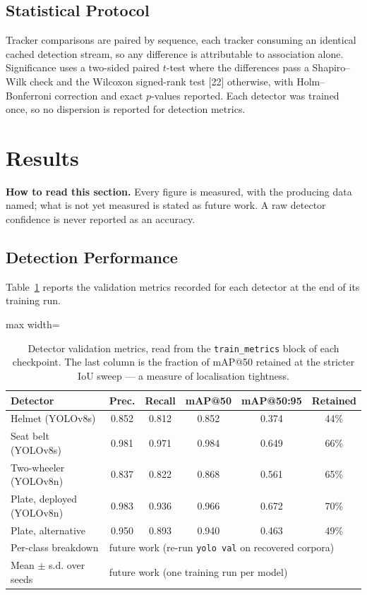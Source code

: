 \documentclass[10pt,a4paper,twocolumn]{article}
\newcommand{\code}[1]{\texttt{#1}}
\begin{document}
\subsection{Statistical Protocol}
Tracker comparisons are paired by sequence, each tracker consuming an identical cached detection stream, so any
difference is attributable to association alone. Significance uses a two-sided paired $t$-test where the differences
pass a Shapiro--Wilk check and the Wilcoxon signed-rank test [22] otherwise, with Holm--Bonferroni correction and exact
$p$-values reported. Each detector was trained once, so no dispersion is reported for detection metrics.

\section{Results}
\textbf{How to read this section.} Every figure is measured, with the producing data named; what is not yet measured
is stated as future work. A raw detector confidence is never reported as an accuracy.

\subsection{Detection Performance}
Table~\ref{tab:det} reports the validation metrics recorded for each detector at the end of its training run.

\begin{table}[t]
\centering\scriptsize
\caption{Detector validation metrics, read from the \code{train\_metrics} block of each checkpoint. The last column
is the fraction of mAP@50 retained at the stricter IoU sweep --- a measure of localisation tightness.}\label{tab:det}
\setlength{\tabcolsep}{2.4pt}
\begin{adjustbox}{max width=\columnwidth}
\begin{tabular}{@{}lccccc@{}}
\toprule
Detector & Prec. & Recall & mAP@50 & mAP@50:95 & Retained\\
\midrule
Helmet (YOLOv8s) & 0.852 & 0.812 & 0.852 & 0.374 & 44\%\\
Seat belt (YOLOv8s) & 0.981 & 0.971 & 0.984 & 0.649 & 66\%\\
Two-wheeler (YOLOv8n) & 0.837 & 0.822 & 0.868 & 0.561 & 65\%\\
Plate, deployed (YOLOv8n) & 0.983 & 0.936 & 0.966 & 0.672 & 70\%\\
Plate, alternative & 0.950 & 0.893 & 0.940 & 0.463 & 49\%\\
\midrule
Per-class breakdown & \multicolumn{5}{l}{future work (re-run \code{yolo val} on recovered corpora)}\\
Mean $\pm$ s.d. over seeds & \multicolumn{5}{l}{future work (one training run per model)}\\
\bottomrule
\end{tabular}
\end{adjustbox}
\end{table}
\end{document}
